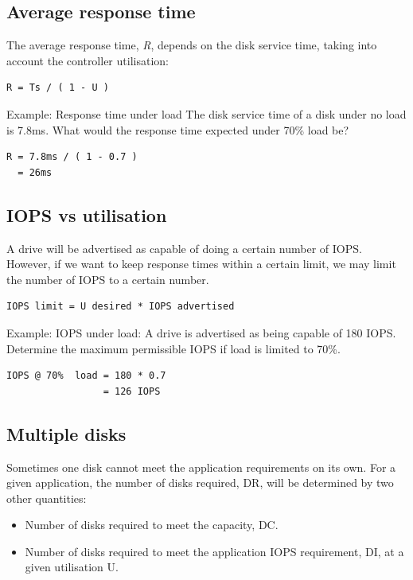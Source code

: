 \subsection{Average response time}\label{average-response-time}

The average response time, {\emph{R}}, depends on the disk service time,
taking into account the controller utilisation:

\begin{verbatim}
R = Ts / ( 1 - U )
\end{verbatim}

Example: Response time under load The disk service time of a disk under
no load is 7.8ms. What would the response time expected under 70\% load
be?

\begin{verbatim}
R = 7.8ms / ( 1 - 0.7 )
  = 26ms
\end{verbatim}

\subsection{IOPS vs utilisation}\label{iops-vs-utilisation}

A drive will be advertised as capable of doing a certain number of IOPS.
However, if we want to keep response times within a certain limit, we
may limit the number of IOPS to a certain number.

\begin{verbatim}
IOPS limit = U desired * IOPS advertised
\end{verbatim}

Example: IOPS under load: A drive is advertised as being capable of 180
IOPS. Determine the maximum permissible IOPS if load is limited to 70\%.

\begin{verbatim}
IOPS @ 70%  load = 180 * 0.7
                 = 126 IOPS
\end{verbatim}

\subsection{Multiple disks}\label{multiple-disks}

Sometimes one disk cannot meet the application requirements on its own.
For a given application, the number of disks required, DR, will be
determined by two other quantities:

\begin{itemize}
\item
  Number of disks required to meet the capacity, DC.
\item
  Number of disks required to meet the application IOPS requirement, DI,
  at a given utilisation U.
\end{itemize}

